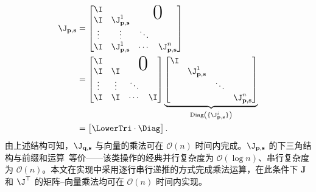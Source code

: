 \begin{equation}
  \begin{aligned}
    \J_{\mathbf{p, s}} & =
    \begin{bmatrix}
      \I     &                        &                                                 &                        \\
      \I     & \J^{1}_{\mathbf{p, s}} & \multicolumn{2}{c}{\raisebox{1ex}[0pt]{\Huge0}}                          \\
      \vdots & \vdots                 & \ddots                                          &                        \\
      \I     & \J^{1}_{\mathbf{p, s}} & \cdots                                          & \J^{n}_{\mathbf{p, s}} \\
    \end{bmatrix} \\
                       & =
    \begin{bmatrix}
      \I     &        &                                                      \\
      \I     & \I     & \multicolumn{2}{c}{\raisebox{1ex}[0pt]{\Huge0}}      \\
      \vdots & \vdots & \ddots                                          &    \\
      \I     & \I     & \cdots                                          & \I \\
    \end{bmatrix}
    \underbrace{
    \begin{bmatrix}
        \I &                        &        &                        \\
           & \J^{1}_{\mathbf{p, s}} &        &                        \\
           &                        & \ddots &                        \\
           &                        &        & \J^{n}_{\mathbf{p, s}}
      \end{bmatrix}}_{\mathrm{Diag}\left(\{\J^{i}_{\mathbf{p, s}}\}\right)}                                      \\&=
    \begin{bmatrix}
      \LowerTri \cdot \Diag
    \end{bmatrix}.
  \end{aligned}
\end{equation}
由上述结构可知，$\J_{\mathbf{q, s}}$ 与向量的乘法可在 $\mathcal{O}(n)$ 时间内完成。$\J_{\mathbf{p, s}}$ 的下三角结构与前缀和运算~\cite{harris2007parallel}等价——该类操作的经典并行复杂度为 $\mathcal{O}(\log n)$、串行复杂度为 $\mathcal{O}(n)$。本文在实现中采用逐行串行递推的方式完成乘法运算，在此条件下 $\mathbf J$ 和 $\J^{\top}$ 的矩阵--向量乘法均可在 $\mathcal{O}(n)$ 时间内实现。


